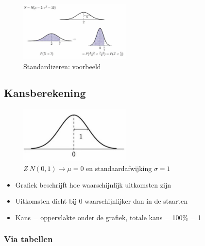 \documentclass{article}
\begin{document}
\begin{figure}[H]
    \centering
    \includegraphics[width=0.5\textwidth]{standardizering-voorbeeld.png}
    \caption{Standardizeren: voorbeeld}
\end{figure}

\subsection{Kansberekening}

\begin{figure}[H]
    \centering
    \includegraphics[width=0.5\textwidth]{normaalverdeling-kansen.png}
    \caption{$Z ~ N(0, 1) \rightarrow \mu = 0$ en standaardafwijking $\sigma = 1$}
\end{figure}

\begin{itemize}
    \item Grafiek beschrijft hoe waarschijnlijk uitkomsten zijn
    \item Uitkomsten dicht bij 0 waarschijnlijker dan in de staarten
    \item Kans = oppervlakte onder de grafiek, totale kans = 100\% = 1
\end{itemize}

\subsubsection{Via tabellen}
\end{document}
